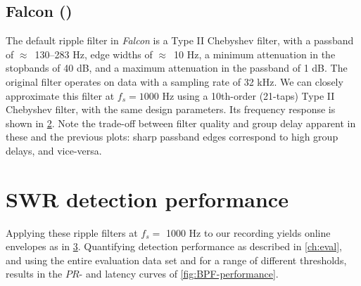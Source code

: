\begin{figure}
\label{fig:dutta}
\end{figure}


\subsection{Falcon ()}

The default ripple filter in \emph{Falcon} is a Type II Chebyshev filter, with a passband of $\approx$~130--283 Hz, edge widths of $\approx$~10 Hz, a minimum attenuation in the stopbands of 40 dB, and a maximum attenuation in the passband of 1 dB. The original filter operates on data with a sampling rate of 32 kHz. We can closely approximate this filter at $f_s = 1000$ Hz using a 10th-order (21-taps) Type II Chebyshev filter, with the same design parameters. Its frequency response is shown in \cref{fig:falcon}. Note the trade-off between filter quality and group delay apparent in these and the previous plots: sharp passband edges correspond to high group delays, and vice-versa.

\begin{figure}
\label{fig:falcon}
\end{figure}



\section{SWR detection performance}

Applying these ripple filters at $f_s = $ 1000 Hz to our recording yields online envelopes as in \cref{fig:BPF-outputs}. Quantifying detection performance as described in \cref{ch:eval}, and using the entire evaluation data set and for a range of different thresholds, results in the $PR$- and latency curves of \cref{fig:BPF-performance}.

\begin{figure}
\label{fig:BPF-outputs}
\end{figure}

